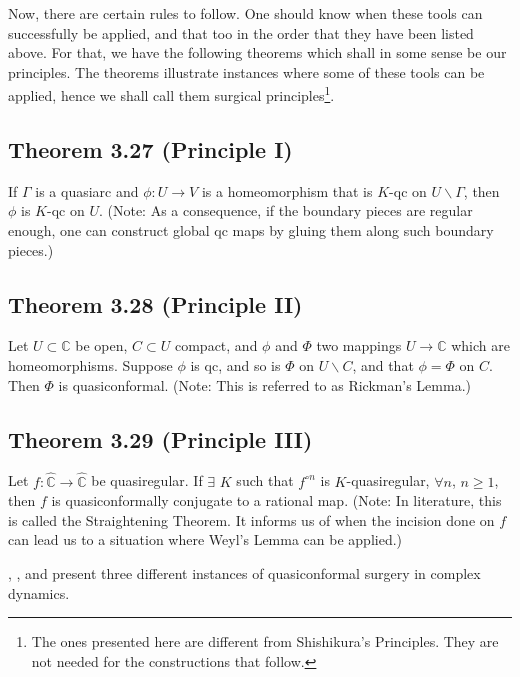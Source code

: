 \documentclass[11pt,a4paper]{article}
\begin{document}
        Now, there are certain rules to follow. One should know when these tools can successfully be applied, and that too in the order that they have been listed above. For that, we have the following theorems which shall in some sense be our principles. The theorems illustrate instances where some of these tools can be applied, hence we shall call them surgical principles\footnote{The ones presented here are different from Shishikura's Principles. They are not needed for the constructions that follow.}.

        \subsection*{Theorem 3.27 (Principle I)} If $\Gamma$ is a quasiarc and $\phi: U \rightarrow V$ is a homeomorphism that is $K$-qc on $U\backslash \Gamma$, then $\phi$ is $K$-qc on $U$. (Note: As a consequence, if the boundary pieces are regular enough, one can construct global qc maps by gluing them along such boundary pieces.)


        \subsection*{Theorem 3.28 (Principle II)} Let $U \subset \mathbb{C}$ be open, $C \subset U$ compact, and $\phi$ and $\Phi$ two mappings $U\rightarrow \mathbb{C}$ which are homeomorphisms. Suppose $\phi$ is qc, and so is $\Phi$ on $U\backslash C$, and that $\phi = \Phi$ on $C$. Then $\Phi$ is quasiconformal. (Note: This is referred to as Rickman's Lemma.)


        \subsection*{Theorem 3.29 (Principle III)} Let $f: \hat{\mathbb{C}} \rightarrow \hat{\mathbb{C}}$ be quasiregular. If $\exists$ $K$ such that $f^{\circ n}$ is $K$-quasiregular, $\forall n$, $n \geq 1$, then $f$ is quasiconformally conjugate to a rational map. (Note: In literature, this is called the Straightening Theorem. It informs us of when the incision done on $f$ can lead us to a situation where Weyl's Lemma can be applied.)



        , , and  present three different instances of quasiconformal surgery in complex dynamics.


\end{document}
